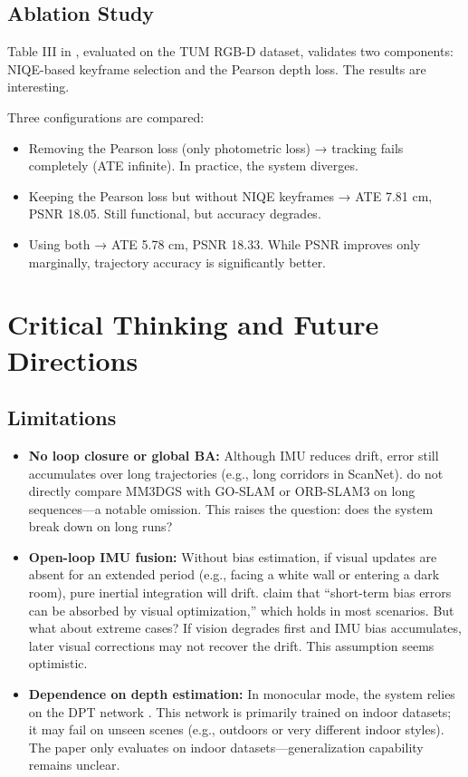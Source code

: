 \documentclass[12pt,a4paper,onecolumn]{article}
\begin{document}
\subsection{Ablation Study}

Table III in \citet{MM3DGS}, evaluated on the TUM RGB-D dataset, validates two components: NIQE-based keyframe selection and the Pearson depth loss. The results are interesting.

Three configurations are compared:
\begin{itemize}
    \item Removing the Pearson loss (only photometric loss) → tracking fails completely (ATE infinite). In practice, the system diverges.
    \item Keeping the Pearson loss but without NIQE keyframes → ATE 7.81 cm, PSNR 18.05. Still functional, but accuracy degrades.
    \item Using both → ATE 5.78 cm, PSNR 18.33. While PSNR improves only marginally, trajectory accuracy is significantly better.
\end{itemize}

\section{Critical Thinking and Future Directions}

\subsection{Limitations}

\begin{itemize}
    \item \textbf{No loop closure or global BA:} Although IMU reduces drift, error still accumulates over long trajectories (e.g., long corridors in ScanNet). \citet{MM3DGS} do not directly compare MM3DGS with GO-SLAM \citep{GO-SLAM} or ORB-SLAM3 \citep{ORB-SLAM3} on long sequences—a notable omission. This raises the question: does the system break down on long runs?

    \item \textbf{Open-loop IMU fusion:} Without bias estimation, if visual updates are absent for an extended period (e.g., facing a white wall or entering a dark room), pure inertial integration will drift. \citet{MM3DGS} claim that ``short-term bias errors can be absorbed by visual optimization,'' which holds in most scenarios. But what about extreme cases? If vision degrades first and IMU bias accumulates, later visual corrections may not recover the drift. This assumption seems optimistic.

    \item \textbf{Dependence on depth estimation:} In monocular mode, the system relies on the DPT network \citep{DPT}. This network is primarily trained on indoor datasets; it may fail on unseen scenes (e.g., outdoors or very different indoor styles). The paper only evaluates on indoor datasets—generalization capability remains unclear.
\end{itemize}
\end{document}
